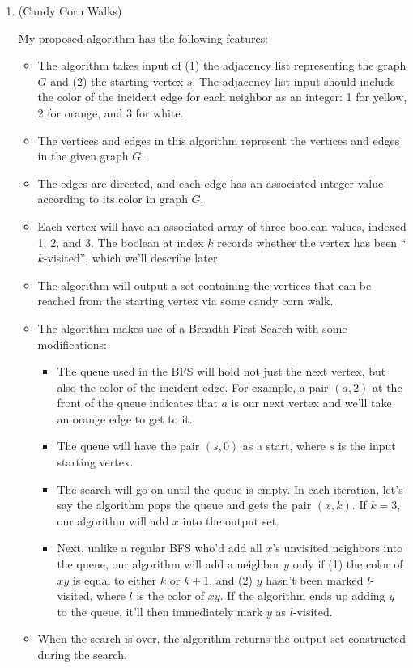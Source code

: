 \documentclass{article}
\begin{document}
\begin{enumerate}

  \item (Candy Corn Walks)

    My proposed algorithm has the following features:
    \begin{itemize}
      \item The algorithm takes input of (1) the adjacency list representing the graph $G$ and (2) the starting vertex $s$. The adjacency list input should include the color of the incident edge for each neighbor as an integer: 1 for yellow, 2 for orange, and 3 for white.
      \item The vertices and edges in this algorithm represent the vertices and edges in the given graph $G$.
      \item The edges are directed, and each edge has an associated integer value according to its color in graph $G$.
      \item Each vertex will have an associated array of three boolean values, indexed 1, 2, and 3. The boolean at index $k$ records whether the vertex has been ``$k$-visited'', which we'll describe later.
      \item The algorithm will output a set containing the vertices that can be reached from the starting vertex via some candy corn walk.
      \item The algorithm makes use of a Breadth-First Search with some modifications:
        \begin{itemize}
          \item The queue used in the BFS will hold not just the next vertex, but also the color of the incident edge. For example, a pair $(a, 2)$ at the front of the queue indicates that $a$ is our next vertex and we'll take an orange edge to get to it.
          \item The queue will have the pair $(s, 0)$ as a start, where $s$ is the input starting vertex.
          \item The search will go on until the queue is empty. In each iteration, let's say the algorithm pops the queue and gets the pair $(x, k)$. If $k = 3$, our algorithm will add $x$ into the output set.
          \item Next, unlike a regular BFS who'd add all $x$'s unvisited neighbors into the queue, our algorithm will add a neighbor $y$ only if (1) the color of $xy$ is equal to either $k$ or $k + 1$, and (2) $y$ hasn't been marked $l$-visited, where $l$ is the color of $xy$. If the algorithm ends up adding $y$ to the queue, it'll then immediately mark $y$ as $l$-visited.
        \end{itemize}
      \item When the search is over, the algorithm returns the output set constructed during the search.
    \end{itemize}


\end{enumerate}
\end{document}
